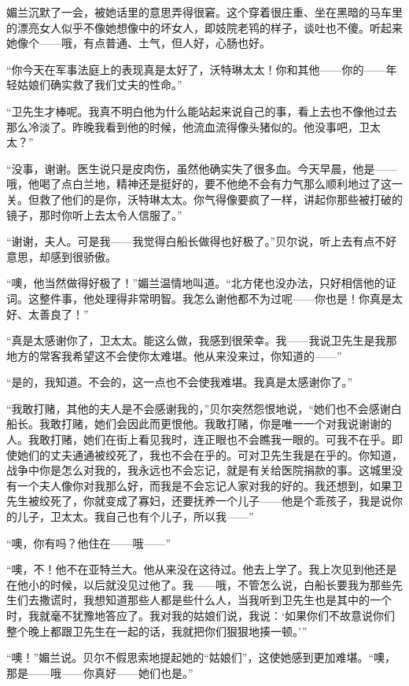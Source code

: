 \par 媚兰沉默了一会，被她话里的意思弄得很窘。这个穿着很庄重、坐在黑暗的马车里的漂亮女人似乎不像她想像中的坏女人，即妓院老鸨的样子，谈吐也不傻。听起来她像个——哦，有点普通、土气，但人好，心肠也好。
\par “你今天在军事法庭上的表现真是太好了，沃特琳太太！你和其他——你的——年轻姑娘们确实救了我们丈夫的性命。”
\par “卫先生才棒呢。我真不明白他为什么能站起来说自己的事，看上去也不像他过去那么冷淡了。昨晚我看到他的时候，他流血流得像头猪似的。他没事吧，卫太太？”
\par “没事，谢谢。医生说只是皮肉伤，虽然他确实失了很多血。今天早晨，他是——哦，他喝了点白兰地，精神还是挺好的，要不他绝不会有力气那么顺利地过了这一关。但救了他们的是你，沃特琳太太。你气得像要疯了一样，讲起你那些被打破的镜子，那时你听上去太令人信服了。”
\par “谢谢，夫人。可是我——我觉得白船长做得也好极了。”贝尔说，听上去有点不好意思，却感到很骄傲。
\par “噢，他当然做得好极了！”媚兰温情地叫道。“北方佬也没办法，只好相信他的证词。这整件事，他处理得非常明智。我怎么谢他都不为过呢——你也是！你真是太好、太善良了！”
\par “真是太感谢你了，卫太太。能这么做，我感到很荣幸。我——我说卫先生是我那地方的常客我希望这不会使你太难堪。他从来没来过，你知道的——”
\par “是的，我知道。不会的，这一点也不会使我难堪。我真是太感谢你了。”
\par “我敢打赌，其他的夫人是不会感谢我的，”贝尔突然怨恨地说，“她们也不会感谢白船长。我敢打赌，她们会因此而更恨他。我敢打赌，你是唯一一个对我说谢谢的人。我敢打赌，她们在街上看见我时，连正眼也不会瞧我一眼的。可我不在乎。即使她们的丈夫通通被绞死了，我也不会在乎的。可对卫先生我是在乎的。你知道，战争中你是怎么对我的，我永远也不会忘记，就是有关给医院捐款的事。这城里没有一个夫人像你对我那么好，而我是不会忘记人家对我的好的。我还想到，如果卫先生被绞死了，你就变成了寡妇，还要抚养一个儿子——他是个乖孩子，我是说你的儿子，卫太太。我自己也有个儿子，所以我——”
\par “噢，你有吗？他住在——哦——”
\par “噢，不！他不在亚特兰大。他从来没在这待过。他去上学了。我上次见到他还是在他小的时候，以后就没见过他了。我——哦，不管怎么说，白船长要我为那些先生们去撒谎时，我想知道那些人都是些什么人，当我听到卫先生也是其中的一个时，我就毫不犹豫地答应了。我对我的姑娘们说，我说：‘如果你们不故意说你们整个晚上都跟卫先生在一起的话，我就把你们狠狠地揍一顿。'”
\par “噢！”媚兰说。贝尔不假思索地提起她的“姑娘们”，这使她感到更加难堪。“噢，那是——哦——你真好——她们也是。”
